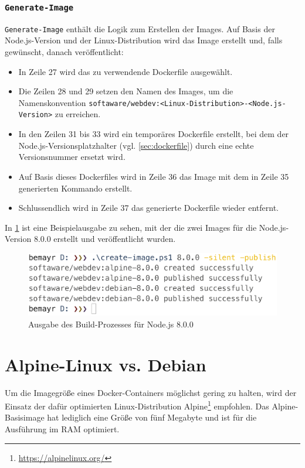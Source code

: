 \subsubsection{\texttt{Generate-Image}}
\verb|Generate-Image| enthält die Logik zum Erstellen der Images.
Auf Basis der Node.js-Version und der Linux-Distribution wird das Image erstellt und, falls gewünscht, danach veröffentlicht:
\begin{itemize}
    \item In Zeile 27 wird das zu verwendende Dockerfile ausgewählt.
    \item Die Zeilen 28 und 29 setzen den Namen des Images, um die Namenskonvention \verb|softaware/webdev:<Linux-Distribution>-<Node.js-Version>| zu erreichen.
    \item In den Zeilen 31 bis 33 wird ein temporäres Dockerfile erstellt, bei dem der Node.js-Versionsplatzhalter (vgl. \cref{sec:dockerfile}) durch eine echte Versionsnummer ersetzt wird.
    \item Auf Basis dieses Dockerfiles wird in Zeile 36 das Image mit dem in Zeile 35 generierten Kommando erstellt.
    \item Schlussendlich wird in Zeile 37 das generierte Dockerfile wieder entfernt.
\end{itemize}
In \cref{fig:create-image} ist eine Beispielausgabe zu sehen, mit der die zwei Images für die Node.js-Version 8.0.0 erstellt und veröffentlicht wurden.
\begin{figure}[htbp]
    \centering
    \includegraphics[width=0.75\linewidth,clip]{images/create-image}
    \caption{Ausgabe des Build-Prozesses für Node.js 8.0.0}
\label{fig:create-image}
\end{figure}

\section{Alpine-Linux vs. Debian}
\label{sec:alpine-vs-debian}
Um die Imagegröße eines Docker-Containers möglichst gering zu halten, wird der Einsatz der dafür optimierten Linux-Distribution Alpine\footnote{\url{https://alpinelinux.org/}} empfohlen.
Das Alpine-Basisimage hat lediglich eine Größe von fünf Megabyte und ist für die Ausführung im RAM optimiert.

